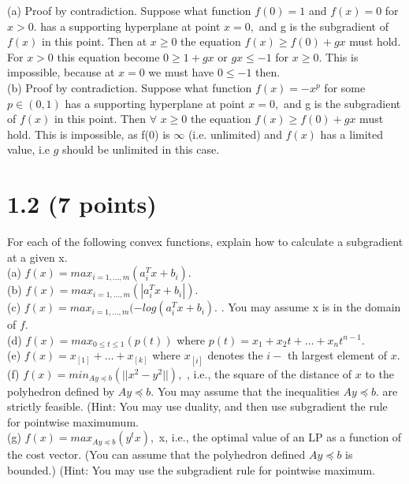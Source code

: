 \documentclass{article}
\begin{document}
(a) Proof by contradiction. 
Suppose what function 
$f(0) = 1$ and $f(x) = 0$ for $x > 0.$ has a supporting hyperplane at point $x = 0,$ and g is the subgradient of $f(x)$ in this point. Then at $x \geq 0$ the equation
$f(x) \geq f(0) + g x$ must hold. For $x > 0$ this equation become $0 \geq 1 + g x $ or $gx \leq - 1$ for $x \geq 0.$ This is impossible, because at $x = 0$ we must have $0 \leq -1 $ then. \\

(b) Proof by contradiction.
Suppose what function $f(x) = -x^p$ for some $p \in (0, 1)$ has a supporting hyperplane at point $x = 0,$ and g is the subgradient of $f(x)$ in this point. Then $\forall$ $x \geq 0$ the equation $f(x) \geq f(0) + g x$ must hold.
This is impossible, as f(0) is $\infty$ (i.e.  unlimited) and $f(x)$ has a limited value, i.e $g$ should be unlimited in this case.\\



\section*{1.2 (7 points)}
 For each of the following convex functions, explain how to calculate a subgradient at a given x.\\
 
 (a) $f(x) = max_{i = 1, \dots, m}(a_i^T x + b_i).$\\
 
 (b) $f(x) = max_{i = 1, \dots, m}(|a_i^T x + b_i|).$\\
 
 (c) $f(x) = max_{i = 1, \dots, m}(- 
 log(a_i^T x + b_i).$ . You may assume x is in the domain of $f.$\\
 
 (d) $f(x) = max_{0 \leq t \leq 1}(p(t))$ where 
 $p(t) = x_1 + x_2 t + \dots + x_n t^{n - 1}.$\\
 
 (e) $f(x) = x_{[1]} + \dots + x_{[k]}$ where $x_{[i]}$ 
 denotes the $i-$ th largest element of $x.$ \\
 
 (f) $f(x) = min_{Ay \preceq b}(||x^2 - y^2||),$ 
 , i.e., the square of the distance of $x$ to the polyhedron defined by $Ay \preceq b.$ You may assume that the inequalities $Ay \preceq b.$ are strictly feasible. (Hint: You may use duality, and then use subgradient the rule for pointwise maximumum.  \\
 
 (g) $f(x) = max_{Ay \preceq b}(y^t x),$  x, i.e., the optimal value of an LP as a function of the cost
 vector. (You can assume that the polyhedron defined 
 $Ay \preceq b$ is bounded.)
 (Hint: You may use the subgradient rule for pointwise maximum.
 
 
 
 
\end{document}
